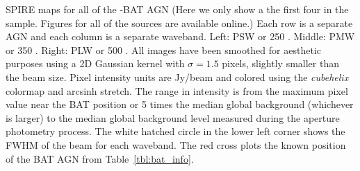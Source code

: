 \label{fig:example_maps} SPIRE maps for all of the \herschel-BAT AGN (Here we only show a the first four in the sample. Figures for all of the sources are available online.) Each row is a separate AGN and each column is a separate waveband. Left: PSW or 250 \um. Middle: PMW or 350 \um. Right: PLW or 500 \um. All images have been smoothed for aesthetic purposes using a 2D Gaussian kernel with $\sigma=1.5$ pixels, slightly smaller than the beam size. Pixel intensity units are Jy/beam and colored using the \textit{cubehelix} colormap \citep{Green:2011sp} and arcsinh stretch. The range in intensity is from the maximum pixel value near the BAT position or 5 times the median global background (whichever is larger) to the median global background level measured during the aperture photometry process.  The white hatched circle in the lower left corner shows the FWHM of the beam for each waveband. The red cross plots the known position of the BAT AGN from Table~\ref{tbl:bat_info}.
  
  
  